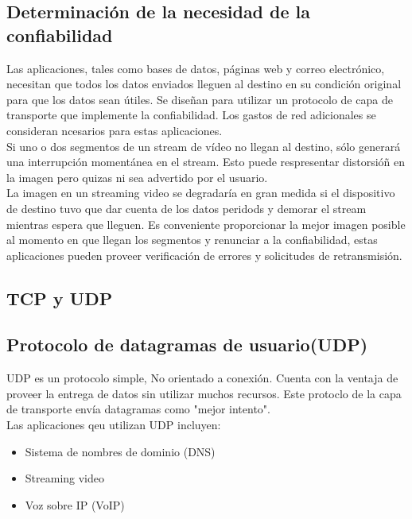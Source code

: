\documentclass[12pt]{report}
\begin{document}
        \subsection{Determinación de la necesidad de la confiabilidad}
        Las aplicaciones, tales como bases de datos, páginas web y correo electrónico, necesitan que todos los datos enviados lleguen al destino en su condición original para que los datos sean útiles.
        Se diseñan para utilizar un protocolo de capa de transporte que implemente la confiabilidad. Los gastos de red adicionales se consideran ncesarios para estas aplicaciones.
        \\Si uno o dos segmentos de un stream de vídeo no llegan al destino, sólo generará una interrupción momentánea en el stream.
        Esto puede respresentar distorsióñ en la imagen pero quizas ni sea advertido por el usuario.
        \\La imagen en un streaming video se degradaría en gran medida si el dispositivo de destino tuvo que dar cuenta de los datos peridods y demorar el stream mientras espera que lleguen.
        Es conveniente proporcionar la mejor imagen posible al momento en que llegan los segmentos y renunciar a la confiabilidad, estas aplicaciones pueden proveer verificación de errores y solicitudes de retransmisión.
        \subsection{TCP y UDP}
        \subsection*{Protocolo de datagramas de usuario(UDP)}
        UDP es un protocolo simple, No orientado a conexión. Cuenta con la ventaja de proveer la entrega de datos sin utilizar muchos recursos.
        Este protoclo de la capa de transporte envía datagramas como "mejor intento".
        \\Las aplicaciones qeu utilizan UDP incluyen:
        \begin{itemize}
            \item Sistema de nombres de dominio (DNS)
            \item Streaming video
            \item Voz sobre IP (VoIP)
        \end{itemize}
\end{document}
